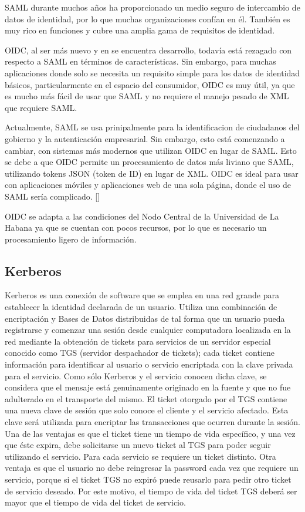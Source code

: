 SAML durante muchos años ha proporcionado un medio seguro de intercambio de datos de identidad, por lo que muchas organizaciones confían en él. También es muy rico en funciones y cubre una amplia gama de requisitos de identidad.


OIDC, al ser más nuevo y en se encuentra desarrollo, todavía está rezagado con respecto a SAML en términos de características. Sin embargo, para muchas aplicaciones donde solo se necesita un requisito simple para los datos de identidad básicos, particularmente en el espacio del consumidor, OIDC es muy útil, ya que es mucho más fácil de usar que SAML y no requiere el manejo pesado de XML que requiere SAML.

Actualmente, SAML se usa prinipalmente para la identificacion de ciudadanos del gobierno y la autenticación empresarial. Sin embargo, esto está comenzando a cambiar, con sistemas más modernos que utilizan OIDC en lugar de SAML. Esto se debe a que OIDC permite un procesamiento de datos más liviano que SAML, utilizando tokens JSON (token de ID) en lugar de XML. OIDC es ideal para usar con aplicaciones móviles y aplicaciones web de una sola página, donde el uso de SAML sería complicado. [\cite{naik2017securing}]

OIDC se adapta a las condiciones del Nodo Central de la Universidad de La Habana ya que se cuentan con pocos recursos, por lo que es necesario un procesamiento ligero de información. 

\subsection{Kerberos}
Kerberos es una conexión de software que se emplea en una red grande para establecer la identidad declarada de un usuario. Utiliza una combinación de encriptación y Bases de Datos distribuidas de tal forma que un usuario pueda registrarse y comenzar una sesión desde cualquier computadora localizada en la red mediante la obtención de tickets para servicios de un servidor especial conocido como TGS (servidor despachador de tickets); cada ticket contiene información para identificar al usuario o servicio encriptada con la clave privada para el servicio. Como sólo Kerberos y el servicio conocen dicha clave, se considera que el mensaje está genuinamente originado en la fuente y que no fue adulterado en el transporte del mismo. El ticket otorgado por el TGS contiene una nueva clave de sesión que solo conoce el cliente y el servicio afectado. Esta clave será utilizada para encriptar las transacciones que ocurren durante la sesión.
Una de las ventajas es que el ticket tiene un tiempo de vida específico, y una vez que éste expira, debe solicitarse un nuevo ticket al TGS para poder seguir utilizando el servicio. Para cada servicio se requiere un ticket distinto. Otra ventaja es que el usuario no debe reingresar la password cada vez que requiere un servicio, porque si el ticket TGS no expiró puede reusarlo para pedir otro ticket de servicio deseado. Por este motivo, el tiempo de vida del ticket TGS deberá ser mayor que el tiempo de vida del ticket de servicio.


